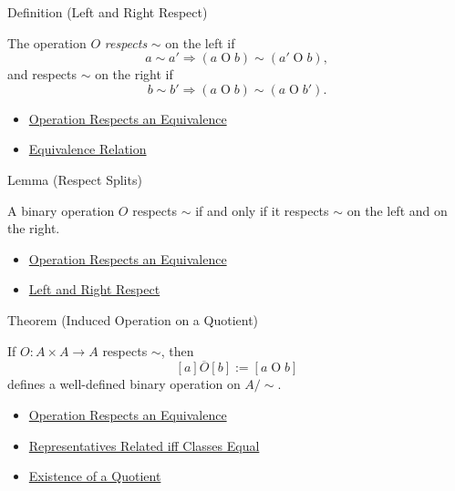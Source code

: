 \begin{definitionbox}{Definition (Left and Right Respect)}
\begin{definition}
\label{def:left-right-respect-equivalence}
The operation $O$ \emph{respects} $\sim$ on the left if
\[
a\sim a'\Longrightarrow (a\mathbin{O}b)\sim(a'\mathbin{O}b),
\]
and respects $\sim$ on the right if
\[
b\sim b'\Longrightarrow (a\mathbin{O}b)\sim(a\mathbin{O}b').
\]
\end{definition}
\end{definitionbox}

\begin{dependencies}
\begin{itemize}
  \item \hyperref[def:operation-respects-equivalence]{Operation Respects an Equivalence}
  \item \hyperref[def:equivalence-relation]{Equivalence Relation}
\end{itemize}
\end{dependencies}

\begin{lemmabox}{Lemma (Respect Splits)}
\begin{lemma}
\label{lem:respect-splits}
A binary operation $O$ respects $\sim$ if and only if it respects $\sim$ on
the left and on the right.
\end{lemma}
\end{lemmabox}

\begin{dependencies}
\begin{itemize}
  \item \hyperref[def:operation-respects-equivalence]{Operation Respects an Equivalence}
  \item \hyperref[def:left-right-respect-equivalence]{Left and Right Respect}
\end{itemize}
\end{dependencies}

\begin{theorembox}{Theorem (Induced Operation on a Quotient)}
\begin{theorem}
\label{thm:induced-operation-on-quotient}
If $O:A\times A\to A$ respects $\sim$, then
\[
[a]\mathbin{\overline{O}}[b]:=[a\mathbin{O}b]
\]
defines a well-defined binary operation on $A/{\sim}$.
\end{theorem}
\end{theorembox}

\begin{dependencies}
\begin{itemize}
  \item \hyperref[def:operation-respects-equivalence]{Operation Respects an Equivalence}
  \item \hyperref[prop:representatives-related-iff-classes-equal]{Representatives Related iff Classes Equal}
  \item \hyperref[thm:existence-of-a-quotient]{Existence of a Quotient}
\end{itemize}
\end{dependencies}

